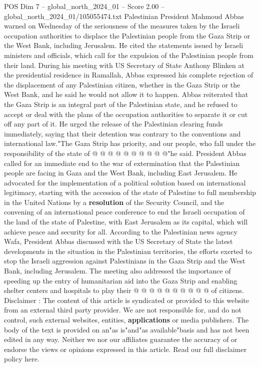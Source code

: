 \begin{textsample}{POS Dim 7 – global\_north\_2024\_01 – Score 2.00 – global\_north\_2024\_01/105055474.txt}  \label{ex:f7_pos_243}
Palestinian President Mahmoud Abbas warned on Wednesday of the seriousness of the measures taken by the Israeli occupation authorities to displace the Palestinian people from the Gaza Strip or the West Bank, including Jerusalem.
He cited the statements issued by Israeli ministers and officials, which call for the expulsion of the Palestinian people from their land.
During his meeting with US Secretary of State Anthony Blinken at the presidential residence in Ramallah, Abbas expressed his complete rejection of the displacement of any Palestinian citizen, whether in the Gaza Strip or the West Bank, and he said he would not allow it to happen.
Abbas reiterated that the Gaza Strip is an integral part of the Palestinian state, and he refused to accept or deal with the plans of the occupation authorities to separate it or cut off any part of it.
He urged the release of the Palestinian clearing funds immediately, saying that their detention was contrary to the conventions and international law."The Gaza Strip has priority, and our people, who fall under the responsibility of the state of @ @ @ @ @ @ @ @ @ @"he said.
President Abbas called for an immediate end to the war of extermination that the Palestinian people are facing in Gaza and the West Bank, including East Jerusalem.
He advocated for the implementation of a political solution based on international legitimacy, starting with the accession of the state of Palestine to full membership in the United Nations by a \textbf{resolution} of the Security Council, and the convening of an international peace conference to end the Israeli occupation of the land of the state of Palestine, with East Jerusalem as its capital, which will achieve peace and security for all.
According to the Palestinian news agency Wafa, President Abbas discussed with the US Secretary of State the latest developments in the situation in the Palestinian territories, the efforts exerted to stop the Israeli aggression against Palestinians in the Gaza Strip and the West Bank, including Jerusalem.
The meeting also addressed the importance of speeding up the entry of humanitarian aid into the Gaza Strip and enabling shelter centers and hospitals to play their @ @ @ @ @ @ @ @ @ @ of citizens.
Disclaimer : The content of this article is syndicated or provided to this website from an external third party provider.
We are not responsible for, and do not control, such external websites, entities, \textbf{applications} or media publishers.
The body of the text is provided on an"as is"and"as available"basis and has not been edited in any way.
Neither we nor our affiliates guarantee the accuracy of or endorse the views or opinions expressed in this article.
Read our full disclaimer policy here.

\end{textsample}
